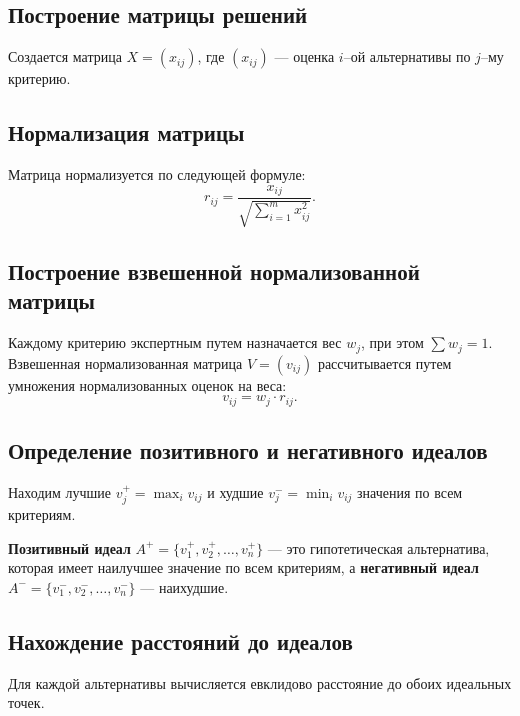 \subsection*{Построение матрицы решений} 

Создается матрица $X = (x_{ij})$, где $(x_{ij})$ --- оценка $i$--ой альтернативы по $j$--му критерию.

\subsection*{Нормализация матрицы} 

Матрица нормализуется по следующей формуле:
\begin{equation}
	r_{ij} = \frac{x_{ij}}{\sqrt{\sum_{i=1}^{m} x_{ij}^2}}.
	\label{eq:TOPSIS_rij}
\end{equation}

\subsection*{Построение взвешенной нормализованной матрицы} 

Каждому критерию экспертным путем назначается вес $w_j$, при этом $\sum{w_j} = 1$. 
Взвешенная нормализованная матрица $V = (v_{ij})$ рассчитывается путем умножения нормализованных оценок на веса:
\begin{equation}
	v_{ij} = w_j \cdot r_{ij}.
	\label{eq:TOPSIS_vij}
\end{equation}

\subsection*{Определение позитивного и негативного идеалов} 

Находим лучшие $v_j^+ = \max_i v_{ij}$ и худшие $v_j^- = \min_i v_{ij}$ значения по всем критериям.

\textbf{Позитивный идеал} $A^+ = \{ v_1^+, v_2^+, \dots, v_n^+ \}$ --- это гипотетическая альтернатива, которая имеет наилучшее значение по всем критериям,
а \textbf{негативный идеал} $A^- = \{ v_1^-, v_2^-, \dots, v_n^- \}$ --- наихудшие.

\subsection*{Нахождение расстояний до идеалов} 

Для каждой альтернативы вычисляется евклидово расстояние до обоих идеальных точек.

